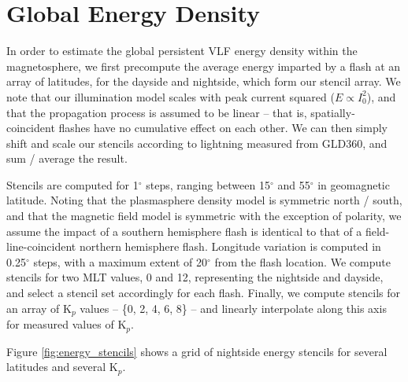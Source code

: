 \section{Global Energy Density}
In order to estimate the global persistent VLF energy density within the magnetosphere, we first precompute the average energy imparted by a flash at an array of latitudes, for the dayside and nightside, which form our stencil array. We note that our illumination model scales with peak current squared ($E \propto I_0^2$), and that the propagation process is assumed to be linear -- that is, spatially-coincident flashes have no cumulative effect on each other. We can then simply shift and scale our stencils according to lightning measured from GLD360, and sum / average the result. 

Stencils are computed for 1$^\circ$ steps, ranging between 15$^\circ$ and 55$^\circ$ in geomagnetic latitude. Noting that the plasmasphere density model is symmetric north / south, and that the magnetic field model is symmetric with the exception of polarity, we assume the impact of a southern hemisphere flash is identical to that of a field-line-coincident northern hemisphere flash. Longitude variation is computed in 0.25$^\circ$ steps, with a maximum extent of 20$^\circ$ from the flash location. We compute stencils for two MLT values, 0 and 12, representing the nightside and dayside, and select a stencil set accordingly for each flash. Finally, we compute stencils for an array of K$_p$ values -- \{0, 2, 4, 6, 8\} -- and linearly interpolate along this axis for measured values of K$_p$.

Figure \ref{fig:energy_stencils} shows a grid of nightside energy stencils for several latitudes and several K$_p$.

